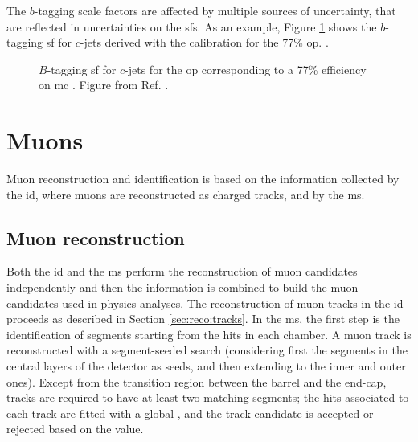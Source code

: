The $b$-tagging scale factors are affected by multiple sources of uncertainty, that are reflected in uncertainties on the \glspl{sf}.
As an example, Figure \ref{fig:obj:btagSF} shows the $b$-tagging \gls{sf} for $c$-jets derived with the \ttbar calibration for the
77\% \gls{op}. .

\begin{figure}[h]
\begin{center}
\end{center}
 \caption{$B$-tagging \gls{sf} for $c$-jets for the \gls{op} corresponding to a 77\% efficiency on \gls{mc} \ttbar. Figure from Ref. \cite{ATLAS:2018bpl}.}
  \label{fig:obj:btagSF}
\end{figure}


\section{Muons}

Muon reconstruction and identification \cite{Aad:2016jkr} is based on the information collected by the \gls{id}, where muons are reconstructed as charged tracks, and by the \gls{ms}. 

\subsection{Muon reconstruction}

Both the \gls{id} and the \gls{ms} perform the reconstruction
of muon candidates independently and then the information is combined to build the muon candidates used in physics analyses. 
The reconstruction of muon tracks in the \gls{id} proceeds as described in Section \ref{sec:reco:tracks}. In the \gls{ms}, the first step is the identification of segments starting from the hits in each chamber. A muon track is reconstructed with a segment-seeded search (considering first the segments in the central layers of the detector as seeds, and then extending to the inner and outer ones). Except from the transition region between the barrel and the end-cap, tracks are required to have at least two matching segments; the hits associated to each track are fitted with a global \chis, and the track candidate is accepted or rejected based on the \chis value. 

